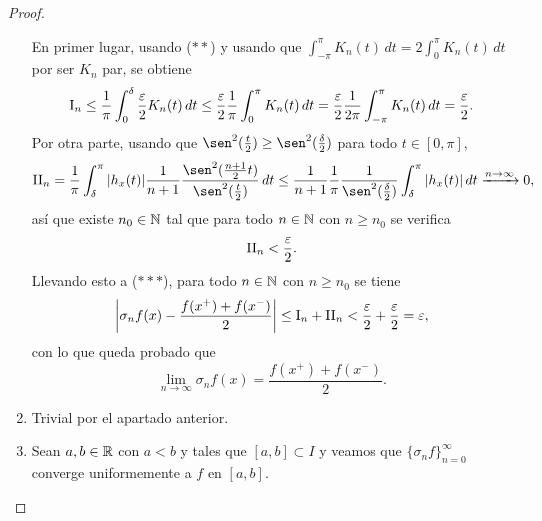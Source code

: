 \documentclass[a4paper, 11pt, oneside]{report}
\begin{document}
\begin{proof}
\begin{enumerate}
    En primer lugar, usando ($\ast\ast$) y usando que $\int_{-\pi}^\pi K_n(t) \, dt = 2\int_0^\pi K_n(t) \, dt$ por ser $K_n$ par, se obtiene
    \[\textup{I}_n \leq \frac{1}{\pi}\int_0^\delta \frac{\varepsilon}{2}K_n(t) \, dt \leq \frac{\varepsilon}{2}\frac{1}{\pi}\int_0^\pi K_n(t) \, dt = \frac{\varepsilon}{2}\frac{1}{2\pi}\int_{-\pi}^\pi K_n(t) \, dt = \frac{\varepsilon}{2}.\]
    Por otra parte, usando que $\sen^2(\frac{t}{2}) \geq \sen^2(\frac{\delta}{2})$ para todo $t \in [0,\pi]$,
    \[\textup{II}_n = \frac{1}{\pi}\int_\delta^\pi |h_x(t)| \frac{1}{n+1}\frac{\sen^2(\frac{n+1}{2}t)}{\sen^2(\frac{t}{2})} \, dt \leq \frac{1}{n+1}\frac{1}{\pi}\frac{1}{\sen^2(\frac{\delta}{2})} \int_\delta^\pi |h_x(t)| \, dt \xrightarrow{n \to \infty} 0,\]
    así que existe $n_0 \in \mathbb N$ tal que para todo $n \in \mathbb N$ con $n \geq n_0$ se verifica \[\textup{II}_n < \frac{\varepsilon}{2}.\]
    Llevando esto a ($\ast\ast\ast$), para todo $n \in \mathbb N$ con $n \geq n_0$ se tiene
    \[\biggl|\sigma_nf(x) - \frac{f(x^+)+f(x^-)}{2}\biggr| \leq \textup{I}_n+\textup{II}_n < \frac{\varepsilon}{2}+\frac{\varepsilon}{2} = \varepsilon,\]
    con lo que queda probado que
    \[\lim_{n \to \infty} \sigma_nf(x) = \frac{f(x^+)+f(x^-)}{2}.\]
    \item Trivial por el apartado anterior.
    \item Sean $a,b \in \mathbb R$ con $a < b$ y tales que $[a,b] \subset I$ y veamos que $\{\sigma_nf\}_{n=0}^\infty$ converge uniformemente a $f$ en $[a,b]$. 
    

\end{enumerate}
\end{proof}
\end{document}
